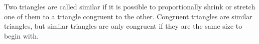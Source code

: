 \begin{table}[H]
          
          \label{m38380*eip-665}Two triangles are called similar if it is possible to proportionally shrink or stretch one of them to a triangle congruent to the other. Congruent triangles are similar triangles, but similar triangles are only congruent if they are the same size to begin with.\par 
    
      
    
    \setlength\mytablespace{4\tabcolsep}
    \addtolength\mytablespace{3\arrayrulewidth}
    \setlength\mytablewidth{\linewidth}
        
    
    \setlength\mytableroom{\mytablewidth}
    \addtolength\mytableroom{-\mytablespace}
    
    \setlength\myfixedwidth{0pt}
    \setlength\mystarwidth{\mytableroom}
        \addtolength\mystarwidth{-\myfixedwidth}
        \divide{}
        
    
            
    
        \begin{center}
      
      \label{m38380*id318196}
      
    \noindent
      \tablelasttail{}
      \begin{xtabular*}{\mytablewidth}[t]{|p{10\mystarwidth}|p{10\mystarwidth}|}\hline
    
    
        

\end{xtabular*}
\end{center}
\end{table}
